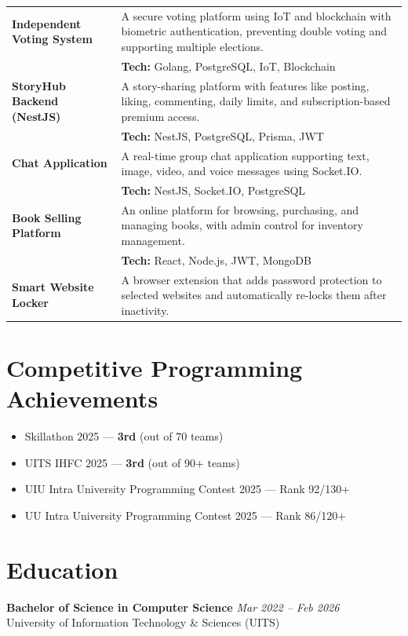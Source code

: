 \documentclass[11pt,a4paper]{article}
\begin{document}
{\small
\begin{tabular}{p{} p{}}

\textbf{Independent Voting System} &
A secure voting platform using IoT and blockchain with biometric authentication, preventing double voting and supporting multiple elections.\\
& \textbf{Tech:} Golang, PostgreSQL, IoT, Blockchain \\

\textbf{StoryHub Backend (NestJS)} &
A story-sharing platform with features like posting, liking, commenting, daily limits, and subscription-based premium access.\\
& \textbf{Tech:} NestJS, PostgreSQL, Prisma, JWT \\

\textbf{Chat Application} &
A real-time group chat application supporting text, image, video, and voice messages using Socket.IO.\\
& \textbf{Tech:} NestJS, Socket.IO, PostgreSQL \\

\textbf{Book Selling Platform} &
An online platform for browsing, purchasing, and managing books, with admin control for inventory management.\\
& \textbf{Tech:} React, Node.js, JWT, MongoDB \\

\textbf{Smart Website Locker} &
A browser extension that adds password protection to selected websites and automatically re-locks them after inactivity.\\

\end{tabular}
}

\section*{Competitive Programming Achievements}
\begin{itemize} [leftmargin=2em]
    \item Skillathon 2025 — \textbf{3rd} (out of 70 teams)
    \item UITS IHFC 2025 — \textbf{3rd} (out of 90+ teams)
    \item UIU Intra University Programming Contest 2025 — Rank 92/130+
    \item UU Intra University Programming Contest 2025 — Rank 86/120+
\end{itemize}

\section*{Education}
\textbf{Bachelor of Science in Computer Science} \hfill \textit{Mar 2022 – Feb 2026}\\
University of Information Technology \& Sciences (UITS)
\end{document}
